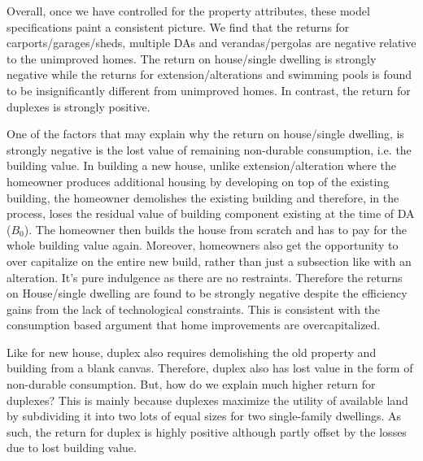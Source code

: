 \documentclass[AEJ,reqno, draftmode]{AEA} %
\begin{document}
Overall, once we have controlled for the property attributes, these model specifications paint a consistent picture. We find that the returns for carports/garages/sheds, multiple DAs and verandas/pergolas are negative relative to the unimproved homes. The return on house/single dwelling is strongly negative while the returns for extension/alterations and swimming pools is found to be insignificantly different from unimproved homes. In contrast, the return for duplexes is strongly positive.

One of the factors that may explain why the return on house/single dwelling, is strongly negative is the lost value of remaining non-durable consumption, i.e. the building value. In building a new house, unlike extension/alteration where the homeowner produces additional housing by developing on top of the existing building, the homeowner demolishes the existing building and therefore, in the process, loses the residual value of building component existing at the time of DA ($B_0$). The homeowner then builds the house from scratch and has to pay for the whole building value again. Moreover, homeowners also get the opportunity to over capitalize on the entire new build, rather than just a subsection like with an alteration. It's pure indulgence as there are no restraints. Therefore the returns on House/single dwelling are found to be strongly negative despite the efficiency gains from the lack of technological constraints. This is consistent with the consumption based argument that home improvements are overcapitalized.

Like for new house, duplex also requires demolishing the old property and building from a blank canvas. Therefore, duplex also has lost value in the form of non-durable consumption. But, how do we explain much higher return for duplexes? This is mainly because duplexes maximize the utility of available land by subdividing it into two lots of equal sizes for two single-family dwellings. As such, the return for duplex is highly positive although partly offset by the losses due to lost building value.
\end{document}
